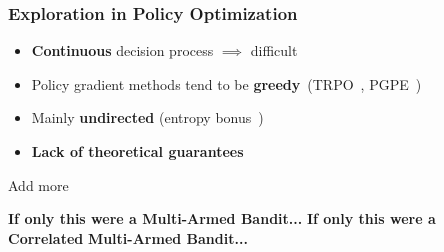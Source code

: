 \documentclass[aspectratio=169, table]{beamer}
\newcommand{\enb}[1]{\textcolor{poliblue1}{\textbf{#1}}}
\newcommand{\eno}[1]{\textcolor{orangep}{\textbf{#1}}}
\begin{document}
\begin{frame} 
\frametitle{Exploration in Policy Optimization}
\begin{overlayarea}{\textwidth}{.75\textheight}
\begin{itemize}
	\setlength{\itemsep}{20pt}
	\item<1-4> \eno{Continuous} decision process $\implies$ difficult\vfill
	\item<2-4> Policy gradient methods tend to be \eno{greedy}~(\eg TRPO~\citep{schulman2015trust}, PGPE~\citep{sehnke2008policy})\vfill
	\item<3-4> Mainly \eno{undirected} (\eg entropy bonus~\citep{haarnoja2018soft})\vfill
	\item<4> \eno{Lack of theoretical guarantees}\vfill
\end{itemize}
Add more
\end{overlayarea}
\begin{overlayarea}{\textwidth}{.25\textheight}
\centering
\vspace{-40pt}
{\Large \enb{If only this were a Multi-Armed Bandit...}}
{\Large \enb{If only this were a} \eno{Correlated} \enb{Multi-Armed Bandit...}}
\end{overlayarea}
\end{frame}
\end{document}
